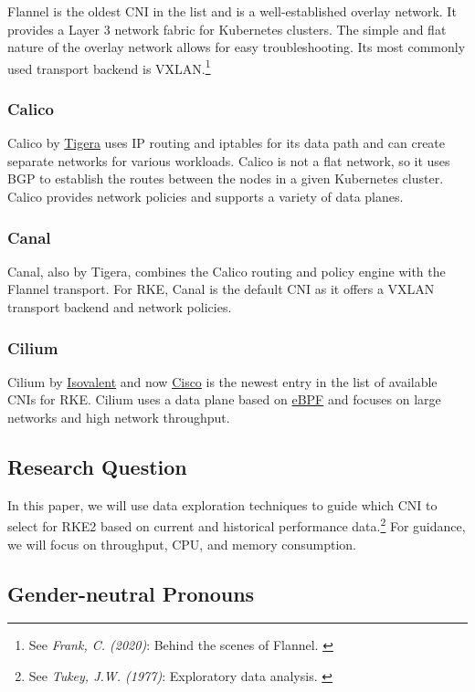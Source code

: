 Flannel is the oldest CNI in the list and is a well-established overlay network. It provides a Layer 3 network fabric for Kubernetes clusters. The simple and flat nature of the overlay network allows for easy troubleshooting. Its most commonly used transport backend is VXLAN.\footnote{See \textit{Frank, C. (2020)}: Behind the scenes of Flannel. \cite{flannel}}

\subsubsection{Calico}

Calico by \href{https://www.tigera.io/}{Tigera} uses IP routing and iptables for its data path and can create separate networks for various workloads. Calico is not a flat network, so it uses BGP to establish the routes between the nodes in a given Kubernetes cluster. Calico provides network policies and supports a variety of data planes.

\subsubsection{Canal}

Canal, also by Tigera, combines the Calico routing and policy engine with the Flannel transport. For RKE, Canal is the default CNI as it offers a VXLAN transport backend and network policies.

\subsubsection{Cilium}

Cilium by \href{https://isovalent.com/}{Isovalent} and now \href{https://www.cisco.com/}{Cisco} is the newest entry in the list of available CNIs for RKE. Cilium uses a data plane based on \href{https://ebpf.io/}{eBPF} and focuses on large networks and high network throughput.

\subsection{Research Question}

In this paper, we will use data exploration techniques to guide which CNI to select for RKE2 based on current and historical performance data.\footnote{See \textit{Tukey, J.W. (1977)}: Exploratory data analysis. \cite{exploratoryDA}} For guidance, we will focus on throughput, CPU, and memory consumption.

\subsection{Gender-neutral Pronouns}

